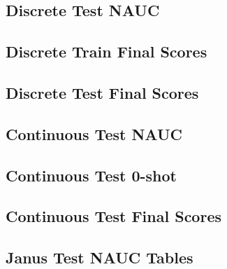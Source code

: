 \documentclass{article} %
\begin{document}
\subsection{Discrete Test NAUC}




\FloatBarrier

\subsection{Discrete Train Final Scores}




\FloatBarrier

\subsection{Discrete Test Final Scores}




\FloatBarrier

\subsection{Continuous Test NAUC}




\FloatBarrier

\subsection{Continuous Test 0-shot}




\FloatBarrier


\subsection{Continuous Test Final Scores}




\FloatBarrier

\subsection{Janus Test NAUC Tables}
\label{app:tab_janus}







\FloatBarrier
% 
% 
\end{document}
